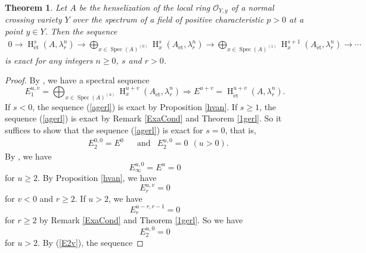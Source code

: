 \documentclass{article}
\newtheorem{thm}{\indent \sc Theorem}[section]
\newcommand{\spec}{\operatorname{Spec}}
\newcommand{\et}{\mathrm{\acute{e}t}}
\newcommand{\HO}{\operatorname{H}}
\begin{document}
%
\begin{thm}\upshape\label{Gtcl}
Let $A$ be the henselization  
of the local ring
$\mathcal{O}_{Y, y}$ of a normal crossing variety $Y$ 
over  the spectrum of
a field of positive characteristic $p>0$
at a point $y\in Y$. 
Then the sequence
%
\begin{align}\label{agerl}
0\to \HO^{s}_{\et}(A, \lambda^{n}_{r})
\to
\bigoplus_{x\in \spec(A)^{(0)}}
\HO^{s}_{x}(A_{\et}, \lambda_{r}^{n})
\to
\bigoplus_{x\in \spec(A)^{(1)}}
\HO^{s+1}_{x}(A_{\et}, \lambda_{r}^{n}) 
\to
\cdots
\end{align}
%
is exact for any integers $n\geq 0$, $s$ and $r>0$.
\end{thm}
%

%
\begin{proof}\upshape
By \cite[Part 1, (1.2)]{C-H-K},
we have a spectral sequence
%
\begin{equation*}
E_{1}^{u, v}
=
\bigoplus_{x\in\spec (A)^{(u)}}
\HO^{u+v}_{x}(
A_{\et}, \lambda^{n}_{r})
\Rightarrow
E^{u+v}
=\HO^{u+v}_{\et}(A, \lambda^{n}_{r}).
\end{equation*}
%
If $s<0$, the sequence (\ref{agerl}) is exact by Proposition \ref{hvan}.
If $s\geq 1$, the sequence (\ref{agerl}) is exact by Remark \ref{ExaCond} and Theorem \ref{1gerl}.
So it suffices to show that 
the sequence (\ref{agerl}) is exact for $s=0$, that is,
%
\begin{align*}
&
E_{2}^{0, 0}=E^{0} 
&& \textrm{and} 
&E^{u, 0}_{2}=0 ~~(u>0).
\end{align*}
%
By \cite[Expos\'{e} X, Th\'{e}or\`{e}me 5.1]{SGA4}, 
we have
%
\begin{equation}\label{VaniEp}
E^{u, 0}_{\infty}=E^{u}=0    
\end{equation}
%
for $u\geq 2$. By Proposition \ref{hvan}, we have
%
\begin{equation}\label{E2v}
E^{u, v}_{r}=0    
\end{equation}
%
for $v<0$ and $r\geq 2$. 
If $u>2$, we have
%
\begin{equation*}
E^{u-r, r-1}_{r}=0    
\end{equation*}
%
for $r\geq 2$ by Remark \ref{ExaCond} and
Theorem \ref{1gerl}.
So we have
%
\begin{equation*}
E^{u, 0}_{2}=0    
\end{equation*}
%
for $u>2$.
By %
(\ref{E2v}), the sequence

\end{proof}
\end{document}
